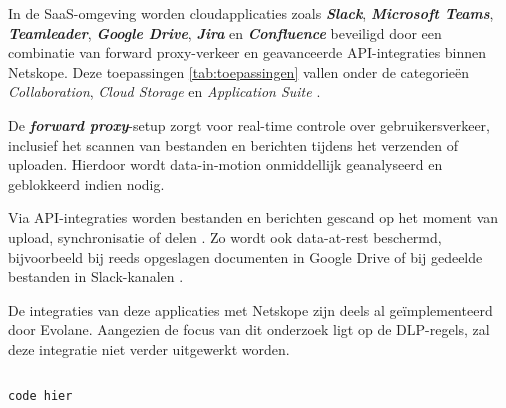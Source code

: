 In de SaaS-omgeving worden cloudapplicaties zoals \textbf{\textit{Slack}}, \textbf{\textit{Microsoft Teams}}, \textbf{\textit{Teamleader}}, 
\textbf{\textit{Google Drive}}, \textbf{\textit{Jira}} en \textbf{\textit{Confluence}} beveiligd door een combinatie van forward proxy-verkeer en geavanceerde API-integraties binnen Netskope. 
Deze toepassingen \ref{tab:toepassingen} vallen onder de categorieën \textit{Collaboration}, \textit{Cloud Storage} en \textit{Application Suite} \autocite{Netskope2025API}.

De \textit{\textbf{forward proxy}}-setup zorgt voor real-time controle over gebruikersverkeer, 
inclusief het scannen van bestanden en berichten tijdens het verzenden of uploaden. 
Hierdoor wordt data-in-motion onmiddellijk geanalyseerd en geblokkeerd indien nodig.

Via API-integraties worden bestanden en berichten gescand op het moment van upload, synchronisatie of delen \autocite{Netskope2025API}. 
Zo wordt ook data-at-rest beschermd, bijvoorbeeld bij reeds opgeslagen documenten in Google Drive of bij gedeelde bestanden in Slack-kanalen \autocite{Netskope2022Slack}.

De integraties van deze applicaties met Netskope zijn deels al geïmplementeerd door Evolane. 
Aangezien de focus van dit onderzoek ligt op de DLP-regels, zal deze integratie niet verder uitgewerkt worden.

\subsection{}
\label{subsubsec:web-poc}




\begin{lstlisting}[language=Python,label={lst:dlp-selenium},caption={Selenium-script voor batchgewijze verzending van testdata}]
    code hier
\end{lstlisting}

